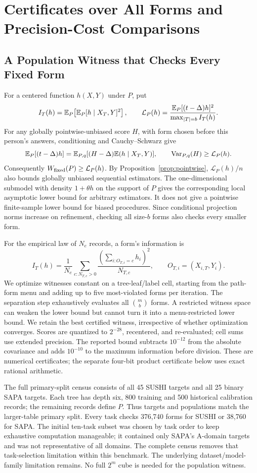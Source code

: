 \section{Certificates over All Forms and Precision-Cost Comparisons}\label{app:allforms}
\subsection{A Population Witness that Checks Every Fixed Form}
For a centered function $h(X,Y)$ under $P$, put
\[
 I_T(h)=\mathbb{E}_P\!\left[\mathbb{E}_P[h\mid X_T,Y]^2\right],\qquad
 \mathcal L_P(h)=\frac{\mathbb{E}_P[(t-\Delta)h]^2}
                         {\max_{|T|=b} I_T(h)}.
\]
For any globally pointwise-unbiased score $H$, with form chosen before this
person's answers, conditioning and Cauchy--Schwarz give
\[
 \mathbb{E}_P[(t-\Delta)h]
 =\mathbb{E}_{P,q}[(H-\Delta)\mathbb{E}(h\mid X_T,Y)],\qquad
 \operatorname{Var}_{P,q}(H)\ge\mathcal L_P(h).
\]
Consequently $W_{\rm fixed}(P)\ge\mathcal L_P(h)$. By
Proposition~\ref{prop:pointwise}, $\mathcal L_P(h)/n$ also bounds globally
unbiased sequential estimators. The one-dimensional submodel with density
$1+\theta h$ on the support of $P$ gives the corresponding local asymptotic
lower bound for arbitrary estimators. It does not give a pointwise
finite-sample lower bound for biased procedures. Since conditional projection
norms increase on refinement, checking all size-$b$ forms also checks every
smaller form.

For the empirical law of $N_e$ records, a form's information is
\[
 I_T(h)=\frac1{N_e}\sum_{c:N_{T,c}>0}
                 \frac{(\sum_{i:O_{T,i}=c}h_i)^2}{N_{T,c}},
 \qquad O_{T,i}=(X_{i,T},Y_i).
\]
We optimize witnesses constant on a tree-leaf/label cell, starting from the
path-form menu and adding up to five most-violated forms per iteration.
The separation step exhaustively evaluates all $\binom mb$ forms. A restricted
witness space can weaken the lower bound but cannot turn it into a
menu-restricted lower bound. We retain the best certified witness, irrespective
of whether optimization converges. Scores are quantized to $2^{-28}$,
recentered, and re-evaluated; cell sums use extended precision. The reported
bound subtracts $10^{-12}$ from the absolute covariance and adds $10^{-10}$
to the maximum information before division. These are numerical certificates;
the separate four-bit product certificate below uses exact rational arithmetic.

The full primary-split census consists of all 45 SUSHI targets and all
25 binary SAPA targets. Each tree has depth six, 800 training and 500
historical calibration records; the remaining records define $P$. Thus
targets and populations match the larger-table primary split. Every task
checks 376,740 forms for SUSHI or 38,760 for SAPA. The initial ten-task
subset was chosen by task order to keep exhaustive computation manageable;
it contained only SAPA's A-domain targets and was not representative of
all domains. The complete census removes that task-selection limitation
within this benchmark. The underlying dataset/model-family limitation
remains. No full $2^m$ cube is needed for the population witness.

